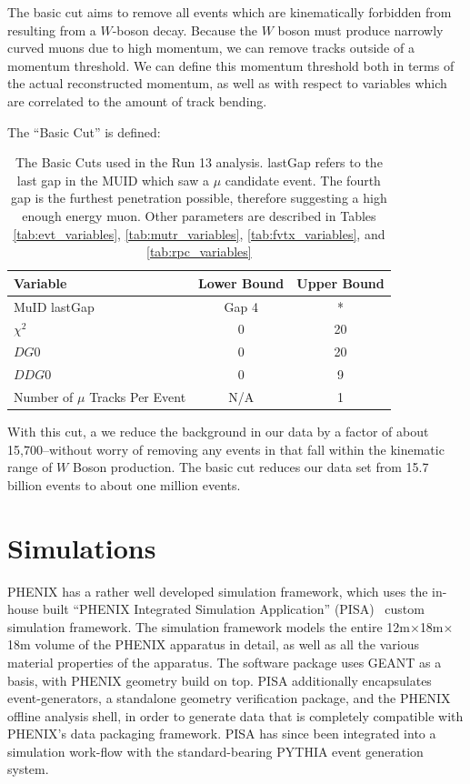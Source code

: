 The basic cut aims to remove all events which are kinematically forbidden from
resulting from a $W$-boson decay. Because the $W$ boson must produce narrowly
curved muons due to high momentum, we can remove tracks outside of a momentum
threshold. We can define this momentum threshold both in terms of the actual
reconstructed momentum, as well as with respect to variables which are
correlated to the amount of track bending.

{\noindent}The ``Basic Cut'' is defined:
\begin{table}[ht]
  \centering
  \begin{tabular}{l c c}
    \toprule
    \textbf{Variable} & \textbf{Lower Bound} & \textbf{Upper Bound} \\
    \midrule
    MuID lastGap & Gap 4 & * \\ 
    $\chi^2$ & 0 & 20 \\
    $DG0$ & 0 & 20 \\
    $DDG0$ & 0 & 9 \\
    Number of $\mu$ Tracks Per Event & N/A & 1 \\
    \bottomrule
  \end{tabular}
  \caption{ 
    The Basic Cuts used in the Run 13 analysis. lastGap refers to the last gap
    in the MUID which saw a $\mu$ candidate event. The fourth gap is the
    furthest penetration possible, therefore suggesting a high enough energy
    muon.  Other parameters are described in Tables \ref{tab:evt_variables},
    \ref{tab:mutr_variables}, \ref{tab:fvtx_variables}, and
    \ref{tab:rpc_variables}
  }
  \label{tab:basic_cut}
\end{table}

With this cut, a we reduce the background in our data by a factor of about
15,700--without worry of removing any events in that fall within the kinematic
range of $W$ Boson production. The basic cut reduces our data set from 15.7
billion events to about one million events.

\clearpage
\section{Simulations}

PHENIX has a rather well developed simulation framework, which uses the in-house
built ``PHENIX Integrated Simulation Application'' (PISA)~\cite{Maguire1997}
custom simulation framework. The simulation framework models the entire
12m$\times$18m$\times$18m volume of the PHENIX apparatus in detail, as well as
all the various material properties of the apparatus. The software package uses
GEANT as a basis, with PHENIX geometry build on top. PISA additionally
encapsulates event-generators, a standalone geometry verification package, and
the PHENIX offline analysis shell, in order to generate data that is completely
compatible with PHENIX's data packaging framework. PISA has since been
integrated into a simulation work-flow with the standard-bearing PYTHIA event
generation system.


